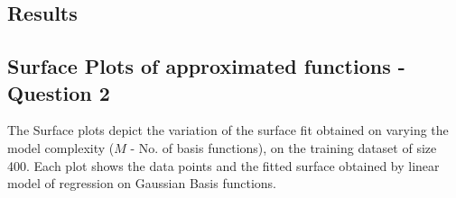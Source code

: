 \documentclass{article}
\begin{document}
\subsection{Results}


\subsection{Surface Plots of approximated functions - Question 2}
\begin{flushleft}
The Surface plots depict the variation of the surface fit obtained on varying the model complexity ($M$ - No. of basis functions), on the training dataset of size 400. Each plot shows the data points and the fitted surface obtained by linear model of regression on Gaussian Basis functions.

\end{flushleft}
\end{document}
